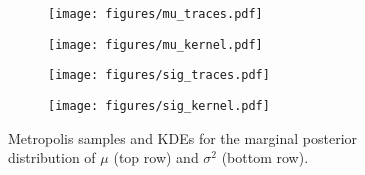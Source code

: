\begin{figure}[H]
    \begin{subfigure}[b]{.49\textwidth}
        \centering
        \texttt{[image: figures/mu\_traces.pdf]}
    \end{subfigure}
    \begin{subfigure}[b]{.49\textwidth}
        \centering
        \texttt{[image: figures/mu\_kernel.pdf]}
    \end{subfigure}
    \begin{subfigure}[b]{.49\textwidth}
        \centering
        \texttt{[image: figures/sig\_traces.pdf]}
    \end{subfigure}
    \begin{subfigure}[b]{.49\textwidth}
        \centering
        \texttt{[image: figures/sig\_kernel.pdf]}
    \end{subfigure}
\caption{Metropolis samples and KDEs for the marginal posterior distribution of $\mu$ (top row) and $\sigma^2$ (bottom row).}
\label{fig:metropolis_results}
\end{figure}


